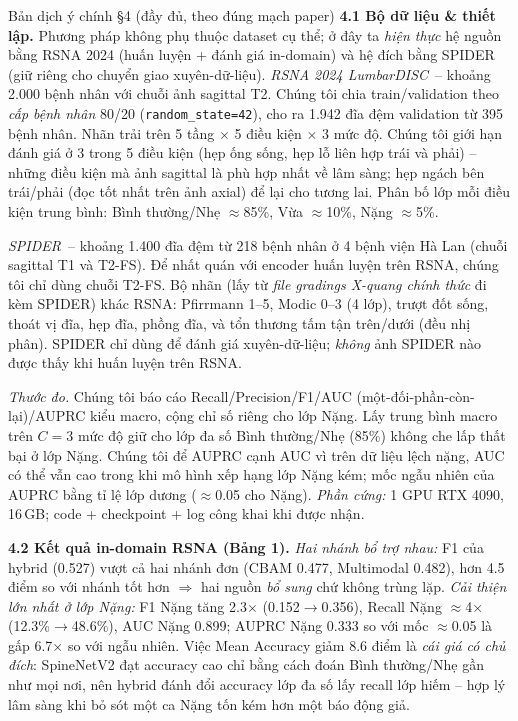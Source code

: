 \documentclass[12pt,a4paper]{article}
\begin{document}
\begin{dichbox}{Bản dịch ý chính §4 (đầy đủ, theo đúng mạch paper)}
\textbf{4.1 Bộ dữ liệu \& thiết lập.}
Phương pháp không phụ thuộc dataset cụ thể; ở đây ta \emph{hiện thực} hệ nguồn bằng RSNA 2024 (huấn luyện + đánh giá in-domain) và hệ đích bằng SPIDER (giữ riêng cho chuyển giao xuyên-dữ-liệu).
\emph{RSNA 2024 LumbarDISC}~-- khoảng 2.000 bệnh nhân với chuỗi ảnh sagittal T2. Chúng tôi chia train/validation theo \emph{cấp bệnh nhân} 80/20 (\texttt{random\_state=42}), cho ra 1.942 đĩa đệm validation từ 395 bệnh nhân. Nhãn trải trên 5 tầng $\times$ 5 điều kiện $\times$ 3 mức độ. Chúng tôi giới hạn đánh giá ở 3 trong 5 điều kiện (hẹp ống sống, hẹp lỗ liên hợp trái và phải) -- những điều kiện mà ảnh sagittal là phù hợp nhất về lâm sàng; hẹp ngách bên trái/phải (đọc tốt nhất trên ảnh axial) để lại cho tương lai. Phân bố lớp mỗi điều kiện trung bình: Bình thường/Nhẹ $\approx$85\%, Vừa $\approx$10\%, Nặng $\approx$5\%.

\emph{SPIDER}~-- khoảng 1.400 đĩa đệm từ 218 bệnh nhân ở 4 bệnh viện Hà Lan (chuỗi sagittal T1 và T2-FS). Để nhất quán với encoder huấn luyện trên RSNA, chúng tôi chỉ dùng chuỗi T2-FS. Bộ nhãn (lấy từ \emph{file gradings X-quang chính thức} đi kèm SPIDER) khác RSNA: Pfirrmann 1--5, Modic 0--3 (4 lớp), trượt đốt sống, thoát vị đĩa, hẹp đĩa, phồng đĩa, và tổn thương tấm tận trên/dưới (đều nhị phân). SPIDER chỉ dùng để đánh giá xuyên-dữ-liệu; \emph{không} ảnh SPIDER nào được thấy khi huấn luyện trên RSNA.

\emph{Thước đo.} Chúng tôi báo cáo Recall/Precision/F1/AUC (một-đối-phần-còn-lại)/AUPRC kiểu macro, cộng chỉ số riêng cho lớp Nặng. Lấy trung bình macro trên $C=3$ mức độ giữ cho lớp đa số Bình thường/Nhẹ (85\%) không che lấp thất bại ở lớp Nặng. Chúng tôi để AUPRC cạnh AUC vì trên dữ liệu lệch nặng, AUC có thể vẫn cao trong khi mô hình xếp hạng lớp Nặng kém; mốc ngẫu nhiên của AUPRC bằng tỉ lệ lớp dương ($\approx$0.05 cho Nặng). \emph{Phần cứng:} 1 GPU RTX 4090, 16\,GB; code + checkpoint + log công khai khi được nhận.

\textbf{4.2 Kết quả in-domain RSNA (Bảng 1).}
\emph{Hai nhánh bổ trợ nhau:} F1 của hybrid (0.527) vượt cả hai nhánh đơn (CBAM 0.477, Multimodal 0.482), hơn 4.5 điểm so với nhánh tốt hơn $\Rightarrow$ hai nguồn \emph{bổ sung} chứ không trùng lặp. \emph{Cải thiện lớn nhất ở lớp Nặng:} F1 Nặng tăng 2.3$\times$ (0.152$\to$0.356), Recall Nặng $\approx$4$\times$ (12.3\%$\to$48.6\%), AUC Nặng 0.899; AUPRC Nặng 0.333 so với mốc $\approx$0.05 là gấp 6.7$\times$ so với ngẫu nhiên. Việc Mean Accuracy giảm 8.6 điểm là \emph{cái giá có chủ đích}: SpineNetV2 đạt accuracy cao chỉ bằng cách đoán Bình thường/Nhẹ gần như mọi nơi, nên hybrid đánh đổi accuracy lớp đa số lấy recall lớp hiếm -- hợp lý lâm sàng khi bỏ sót một ca Nặng tốn kém hơn một báo động giả.


\end{dichbox}
\end{document}
